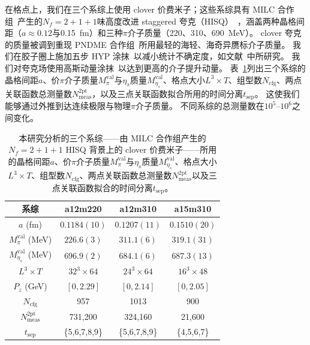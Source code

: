 在格点上，我们在三个系综上使用 clover 价费米子；这些系综具有 MILC 合作组~\cite{Bazavov:2012xda}产生的$N_f = 2+1+1$味高度改进 staggered 夸克（HISQ）~\cite{Follana:2006rc}，涵盖两种晶格间距（$a\approx 0.12$与0.15~fm）和三种$\pi$介子质量（220、310、690~MeV）。
clover 夸克的质量被调到重现 PNDME 合作组~\cite{Rajan:2017lxk,Bhattacharya:2015wna,Bhattacharya:2015esa,Bhattacharya:2013ehc}所用最轻的海轻、海奇异赝标介子质量。
%
我们在胶子圈上施加五步 HYP 涂抹~\cite{Hasenfratz:2001hp}以减小统计不确定度，如文献~\cite{Fan:2018dxu}中所研究。
我们对夸克场使用高斯动量涂抹~\cite{Bali:2016lva}以达到更高的介子提升动量。
表~\ref{table-data}列出三个系综的晶格间距$a$、价$\pi$介子质量$M_\pi^\text{val}$与$\eta_s$质量$M_{\eta_s}^\text{val}$、格点大小$L^3\times T$、组型数$N_\text{cfg}$、两点关联函数总测量数$N_\text{meas}^\text{2pt}$，以及三点关联函数拟合所用的时间分离$t_\text{sep}$。
这使我们能够通过外推到达连续极限与物理$\pi$介子质量。
不同系综的总测量数在$10^5$--$10^6$之间变化。


\begin{table}[!htbp]
\centering
\begin{tabular}{|c|c|c|c|}
\hline
  系综  & a12m220 & a12m310 & a15m310 \\
\hline
  $a$ (fm)  & $0.1184(10)$ & $0.1207(11)$  & $0.1510(20)$ \\
\hline
  $M_{\pi}^\text{val}$ (MeV)  & $226.6(3)$ & $311.1(6)$ & $319.1(31)$\\
\hline
  $M_{\eta_s}^\text{val}$ (MeV)  & $696.9(2)$ & $684.1(6)$ & $687.3(13)$\\
\hline
  $L^3\times T$  & $32^3\times 64$ & $24^3\times 64$ & $16^3\times 48$ \\
\hline
  $P_z$ (GeV)  & $[0,2.29]$ &  $[0,2.14]$ &  $[0,2.05]$ \\
\hline
  $N_\text{cfg}$  & 957 & 1013 & 900 \\
\hline
  $N_\text{meas}^\text{2pt}$  &  731,200  & 324,160 & 21,600 \\
\hline
  $t_\text{sep}$  & \{5,6,7,8,9\}   & \{5,6,7,8,9\} & \{4,5,6,7\} \\
\hline
\end{tabular}
\caption{
本研究分析的三个系综——由 MILC 合作组产生的$N_f=2+1+1$ HISQ 背景上的 clover 价费米子——所用的晶格间距$a$、价$\pi$介子质量$M_\pi^\text{val}$与$\eta_s$质量$M_{\eta_s}^\text{val}$、格点大小$L^3\times T$、组型数$N_\text{cfg}$、两点关联函数总测量数$N_\text{meas}^\text{2pt}$以及三点关联函数拟合的时间分离$t_\text{sep}$。
}
\label{table-data}
\end{table}


